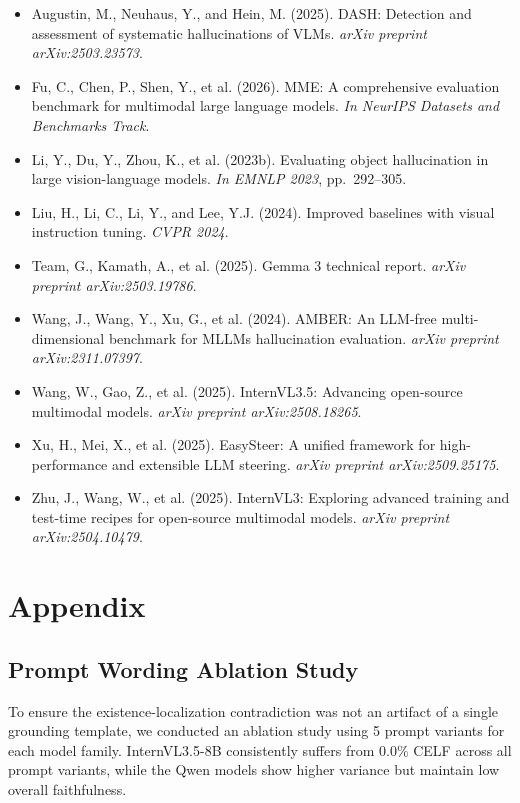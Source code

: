 \documentclass[12pt,a4paper]{article}
\begin{document}
\begin{itemize}[leftmargin=*,label={}]
\item Augustin, M., Neuhaus, Y., and Hein, M. (2025). DASH: Detection and assessment of systematic hallucinations of VLMs. \textit{arXiv preprint arXiv:2503.23573}.
\item Fu, C., Chen, P., Shen, Y., et al. (2026). MME: A comprehensive evaluation benchmark for multimodal large language models. \textit{In NeurIPS Datasets and Benchmarks Track}.
\item Li, Y., Du, Y., Zhou, K., et al. (2023b). Evaluating object hallucination in large vision-language models. \textit{In EMNLP 2023}, pp.~292--305.
\item Liu, H., Li, C., Li, Y., and Lee, Y.J. (2024). Improved baselines with visual instruction tuning. \textit{CVPR 2024}.
\item Team, G., Kamath, A., et al. (2025). Gemma 3 technical report. \textit{arXiv preprint arXiv:2503.19786}.
\item Wang, J., Wang, Y., Xu, G., et al. (2024). AMBER: An LLM-free multi-dimensional benchmark for MLLMs hallucination evaluation. \textit{arXiv preprint arXiv:2311.07397}.
\item Wang, W., Gao, Z., et al. (2025). InternVL3.5: Advancing open-source multimodal models. \textit{arXiv preprint arXiv:2508.18265}.
\item Xu, H., Mei, X., et al. (2025). EasySteer: A unified framework for high-performance and extensible LLM steering. \textit{arXiv preprint arXiv:2509.25175}.
\item Zhu, J., Wang, W., et al. (2025). InternVL3: Exploring advanced training and test-time recipes for open-source multimodal models. \textit{arXiv preprint arXiv:2504.10479}.
\end{itemize}

\section{Appendix}

\subsection{Prompt Wording Ablation Study}
To ensure the existence-localization contradiction was not an artifact of a single grounding template, we conducted an ablation study using 5 prompt variants for each model family. InternVL3.5-8B consistently suffers from 0.0\% CELF across all prompt variants, while the Qwen models show higher variance but maintain low overall faithfulness.
\end{document}

